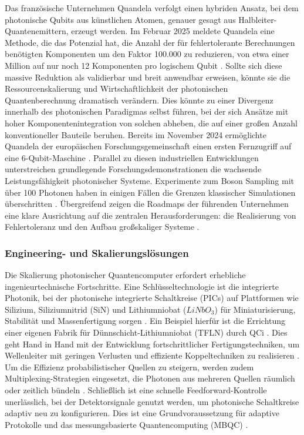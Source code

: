 Das französische Unternehmen Quandela verfolgt einen hybriden Ansatz, bei dem photonische Qubits aus künstlichen Atomen, genauer gesagt aus Halbleiter-Quantenemittern, erzeugt werden. Im Februar 2025 meldete Quandela eine Methode, die das Potenzial hat, die Anzahl der für fehlertolerante Berechnungen benötigten Komponenten um den Faktor 100.000 zu reduzieren, von etwa einer Million auf nur noch 12 Komponenten pro logischem Qubit \cite{QuandelaAnnounces100000fold2025}. Sollte sich diese massive Reduktion als validierbar und breit anwendbar erweisen, könnte sie die Ressourcenskalierung und Wirtschaftlichkeit der photonischen Quantenberechnung dramatisch verändern. Dies könnte zu einer Divergenz innerhalb des photonischen Paradigmas selbst führen, bei der sich Ansätze mit hoher Komponentenintegration von solchen abheben, die auf einer großen Anzahl konventioneller Bauteile beruhen. Bereits im November 2024 ermöglichte Quandela der europäischen Forschungsgemeinschaft einen ersten Fernzugriff auf eine 6-Qubit-Maschine \cite{QuandelaAnnounces100000fold2025}.
Parallel zu diesen industriellen Entwicklungen unterstreichen grundlegende Forschungsdemonstrationen die wachsende Leistungsfähigkeit photonischer Systeme. Experimente zum Boson Sampling mit über 100 Photonen haben in einigen Fällen die Grenzen klassischer Simulationen überschritten \cite{LinearOpticsScalable}. Übergreifend zeigen die Roadmaps der führenden Unternehmen eine klare Ausrichtung auf die zentralen Herausforderungen: die Realisierung von Fehlertoleranz und den Aufbau großskaliger Systeme \cite{QuandelaAnnounces100000fold2025}.

\subsubsection{Engineering- und Skalierungslösungen}
Die Skalierung photonischer Quantencomputer erfordert erhebliche ingenieurtechnische Fortschritte. Eine Schlüsseltechnologie ist die integrierte Photonik, bei der photonische integrierte Schaltkreise (PICs) auf Plattformen wie Silizium, Siliziumnitrid (SiN) und Lithiumniobat ($LiNbO_3$) für Miniaturisierung, Stabilität und Massenfertigung sorgen \cite{abughanemPhotonicQuantumComputers2024}. Ein Beispiel hierfür ist die Errichtung einer eigenen Fabrik für Dünnschicht-Lithiumniobat (TFLN) durch QCi \cite{QuantumComputingInc}. Dies geht Hand in Hand mit der Entwicklung fortschrittlicher Fertigungstechniken, um Wellenleiter mit geringen Verlusten und effiziente Koppeltechniken zu realisieren \cite{LinearOpticsScalable}. Um die Effizienz probabilistischer Quellen zu steigern, werden zudem
Multiplexing-Strategien eingesetzt, die Photonen aus mehreren Quellen räumlich oder zeitlich bündeln \cite{salavrakosPhotonnativeQuantumAlgorithms2025}. Schließlich ist eine schnelle
Feedforward-Kontrolle unerlässlich, bei der Detektorsignale genutzt werden, um photonische Schaltkreise adaptiv neu zu konfigurieren. Dies ist eine Grundvoraussetzung für adaptive Protokolle und das messungsbasierte Quantencomputing (MBQC) \cite{salavrakosPhotonnativeQuantumAlgorithms2025}.

